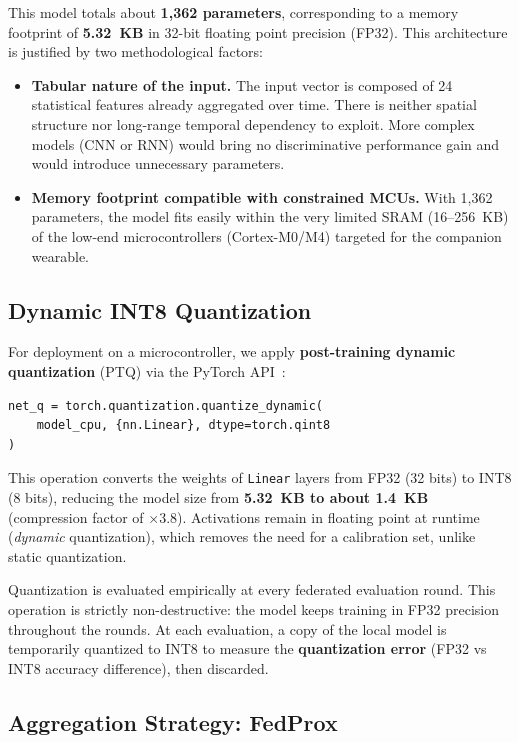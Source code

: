 \documentclass{article}
\begin{document}
This model totals about \textbf{1,362 parameters}, corresponding to a memory
footprint of \textbf{5.32~KB} in 32-bit floating point precision (FP32). This
architecture is justified by two methodological factors:

\begin{itemize}
  \item \textbf{Tabular nature of the input.} The input vector is composed of 24
  statistical features already aggregated over time. There is neither spatial
  structure nor long-range temporal dependency to exploit. More complex models
  (CNN or RNN) would bring no discriminative performance gain and would introduce
  unnecessary parameters.
  \item \textbf{Memory footprint compatible with constrained MCUs.} With 1,362
  parameters, the model fits easily within the very limited SRAM (16--256~KB) of
  the low-end microcontrollers (Cortex-M0/M4) targeted for the companion
  wearable.
\end{itemize}

\subsection{Dynamic INT8 Quantization}
\label{subsec:quantization}

For deployment on a microcontroller, we apply \textbf{post-training dynamic
quantization} (PTQ) via the PyTorch API~\cite{paszke2019pytorch}:

\begin{verbatim}
net_q = torch.quantization.quantize_dynamic(
    model_cpu, {nn.Linear}, dtype=torch.qint8
)
\end{verbatim}

This operation converts the weights of \texttt{Linear} layers from FP32 (32 bits)
to INT8 (8 bits), reducing the model size from \textbf{5.32~KB to about 1.4~KB}
(compression factor of $\times 3.8$). Activations remain in floating point at
runtime (\textit{dynamic} quantization), which removes the need for a calibration
set, unlike static quantization.

Quantization is evaluated empirically at every federated evaluation round. This
operation is strictly non-destructive: the model keeps training in FP32 precision
throughout the rounds. At each evaluation, a copy of the local model is temporarily
quantized to INT8 to measure the \textbf{quantization error} (FP32 vs INT8
accuracy difference), then discarded.

\subsection{Aggregation Strategy: FedProx}
\label{subsec:fedprox}
\end{document}

